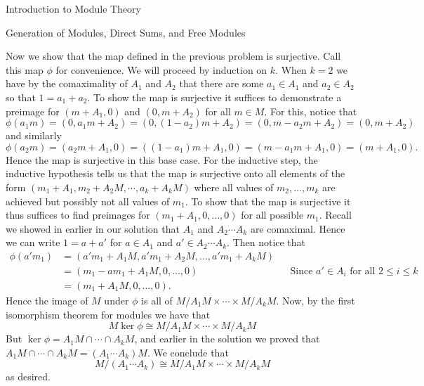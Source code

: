 \begin{chapter}{Introduction to Module Theory}
\begin{section}{Generation of Modules, Direct Sums, and Free Modules}
\begin{solution}
Now we show that the map defined in the previous problem is surjective. Call this map $\phi$ for convenience. We will proceed by induction on $k$. When $k=2$ we have by the comaximality of $A_1$ and $A_2$ that there are some $a_1\in A_1$ and $a_2\in A_2$ so that $1=a_1+a_2$. To show the map is surjective it suffices to demonstrate a preimage for $(m+A_1,0)$ and $(0,m+A_2)$ for all $m\in M$. For this, notice that \[\phi(a_1m) = (0, a_1m+A_2) = (0,(1-a_2)m+A_2) = (0,m-a_2m + A_2) = (0,m+A_2)\]
and similarly \[
\phi(a_2m) = (a_2m+A_1, 0) = ((1-a_1)m+A_1,0) = (m-a_1m+A_1,0) = (m+A_1,0). 
\]
Hence the map is surjective in this base case. For the inductive step, the inductive hypothesis tells us that the map is surjective onto all elements of the form $(m_1+A_1,m_2+A_2M,\cdots, a_k+A_kM)$ where all values of $m_2,\ldots, m_k$ are achieved but possibly not all values of $m_1$. To show that the map is surjective it thus suffices to find preimages for $(m_1+A_1,0,\ldots, 0)$ for all possible $m_1$. Recall we showed in earlier in our solution that $A_1$ and $A_2\cdots A_k$ are comaximal. Hence we can write $1 = a+a'$ for $a\in A_1$ and $a'\in A_2\cdots A_k$. Then notice that \begin{align*}
\phi(a'm_1) &= (a'm_1+A_1M, a'm_1+A_2M,\ldots, a'm_1+A_kM)\\
& = (m_1-am_1 +A_1M, 0,\ldots,0)&&\text{Since $a'\in A_i$ for all $2\le i \le k$}\\
& = (m_1+A_1M, 0,\ldots, 0).
\end{align*}
Hence the image of $M$ under $\phi$ is all of $M/A_1M\times \cdots \times M/A_kM$. Now, by the first isomorphism theorem for modules we have that \[
M\ker\phi \cong M/A_1M\times \cdots \times M/A_kM 
\]
But $\ker\phi = A_1M\cap \cdots \cap A_kM$, and earlier in the solution we proved that $A_1M\cap\cdots \cap A_kM = (A_1\cdots A_k)M$. We conclude that \[
M/(A_1\cdots A_k) \cong M/A_1M\times \cdots \times M/A_kM 
\]
as desired.
\end{solution}\oneperpage




\end{section}
\end{chapter}

